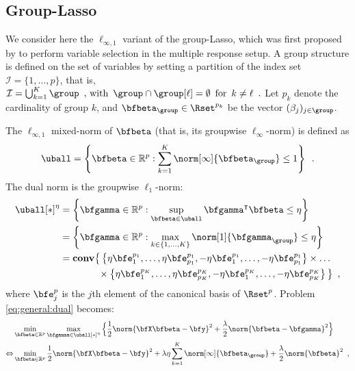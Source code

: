\subsection{Group-Lasso}

We consider here the $\ell_{\infty,1}$ variant of the group-Lasso, which was
first proposed by \citet{Turlach05} to perform variable selection in the
multiple response setup.
%
A group structure is defined on
the set of variables by setting a partition of the index set
$\mathcal{I}=\{1,\ldots,p\}$, that is,
$
  \mathcal{I}=\bigcup_{k=1}^K\group \enspace,\, \text{with}\enspace 
  \group \cap \group[\ell]=\emptyset \enspace
  \text{for}\enspace k\neq\ell \enspace.
$
%
Let $p_k$ denote the cardinality of group $k$, and $\bfbeta_{\group} \in
\Rset^{p_k}$ be the vector $(\beta_j)_{j\in \group}$.
%


The $\ell_{\infty,1}$ mixed-norm of $\bfbeta$ (that is, its groupwise 
$\ell_\infty$-norm) is defined as
%
\begin{equation*}
  \uball = \left\{ 
    \bfbeta \in \mathbb{R}^p :\sum_{k=1}^K \norm[\infty]{\bfbeta_{\group}} \leq 1
  \right\}
  \enspace.
\end{equation*}
%
The dual norm is the groupwise $\ell_1$-norm:
%
\begin{align*}
  \uball[*]^\eta & = \left\{ \bfgamma \in \mathbb{R}^p :
\sup_{\bfbeta\in\uball} \bfgamma^\intercal\bfbeta \leq \eta \right\} \\
    & = \left\{ \bfgamma \in \mathbb{R}^p : \max_{k\in\{1,...,K\}}  \norm[1]{\bfgamma_{\group}} \leq \eta \right\} \\
    & = \mathbf{conv} \big\{ 
                        \left\{\eta\bfe^{p_1}_1, \ldots, \eta\bfe^{p_1}_{p_1},-\eta\bfe^{p_1}_1, \ldots, -\eta\bfe^{p_1}_{p_1} \right\} 
                        \times \ldots \\
    & \hspace*{4em} \times 
                        \left\{\eta\bfe^{p_K}_1, \ldots, \eta\bfe^{p_K}_{p_K},-\eta\bfe^{p_K}_1, \ldots, -\eta\bfe^{p_K}_{p_K} \right\} 
                      \big\}
  \enspace,
\end{align*}
where $\bfe^p_j$ is the $j$th element of the canonical basis of $\Rset^p$.
Problem \eqref{eq:general:dual} becomes:
%
\begin{align*}
  & \min_{\bfbeta\in\mathbb{R}^p} \max_{\bfgamma \in \uball[*]^\eta}
      \Big\{ \frac{1}{2} \norm{\bfX \bfbeta - \bfy}^2 + \frac{\lambda}{2} \norm{\bfbeta - \bfgamma}^2 \Big\} \\
  \Leftrightarrow
    & \min_{\bfbeta\in\mathbb{R}^p}
      \frac{1}{2} \norm{\bfX \bfbeta - \bfy}^2 + \lambda \eta \sum_{k=1}^K \norm[\infty]{\bfbeta_{\group}} + \frac{\lambda}{2} \norm{\bfbeta}^2 
  \enspace,
\end{align*}
%


